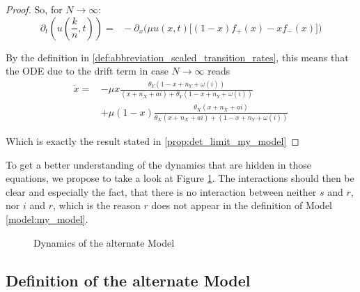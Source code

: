 \documentclass[12pt,a4paper,twoside]{article}
\begin{document}
\begin{proof}
	So, for $N \rightarrow \infty$:
	\begin{equation}
	\partial_t \left(u\left(\frac{k}{n}, t\right)\right)=\phantom{ll} -\partial_x\Big(\mu u(x,t)\big[(1-x)f_+(x) - xf_-(x)\big]\Big)
	\end{equation}
	
	By the definition in \eqref{def:abbreviation_scaled_transition_rates}, this means that the ODE due to the drift term in case $N \rightarrow \infty$ reads 
	\begin{align*}
	\dot{x} = &-\mu x\frac{\theta_Y(1-x+n_Y+\omega\left(i\right))}{(x+n_X+ai) + \theta_Y(1-x+n_Y+\omega\left(i\right))}\\
	\qquad&+ \mu \left(1-x\right)\frac{\theta_X (x+ n_X+ ai)}{\theta_X (x + n_X + ai) + (1-x + n_Y + \omega\left(i\right))}
	\end{align*}
	
	Which is exactly the result stated in \eqref{prop:det_limit_my_model}
\end{proof}

To get a better understanding of the dynamics that are hidden in those equations, we propose to take a look at Figure \ref{fig:my_model}. The interactions should then be clear and especially the fact, that there is no interaction between neither $s$ and $r$, nor $i$ and $r$, which is the reason $r$ does not appear in the definition of Model \ref{model:my_model}. 

\begin{figure}[h!]
	\centering
	\caption{Dynamics of the alternate Model}
	\label{fig:my_model}
	\def\svgwidth{450pt}
	
\end{figure}

\subsection{Definition of the alternate Model}
\end{document}
